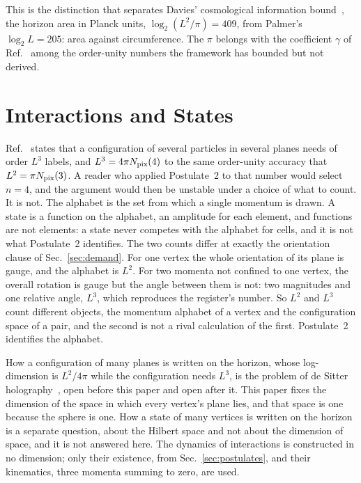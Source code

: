 \documentclass[aps,prd,twocolumn,superscriptaddress,nofootinbib]{revtex4-2}
\begin{document}
This is the distinction that separates Davies' cosmological information bound~\cite{davies2007}, the horizon area in Planck units, $\log_2(L^2/\pi) = 409$, from Palmer's $\log_2 L = 205$: area against circumference. The $\pi$ belongs with the coefficient $\gamma$ of Ref.~\cite{korytko2026} among the order-unity numbers the framework has bounded but not derived.

\section{Interactions and States}
\label{sec:states}

Ref.~\cite{korytko2026c} states that a configuration of several particles in several planes needs of order $L^3$ labels, and $L^3 = 4\pi N_{\rm pix}(4)$ to the same order-unity accuracy that $L^2 = \pi N_{\rm pix}(3)$. A reader who applied Postulate~2 to that number would select $n = 4$, and the argument would then be unstable under a choice of what to count. It is not. The alphabet is the set from which a single momentum is drawn. A state is a function on the alphabet, an amplitude for each element, and functions are not elements: a state never competes with the alphabet for cells, and it is not what Postulate~2 identifies. The two counts differ at exactly the orientation clause of Sec.~\ref{sec:demand}. For one vertex the whole orientation of its plane is gauge, and the alphabet is $L^2$. For two momenta not confined to one vertex, the overall rotation is gauge but the angle between them is not: two magnitudes and one relative angle, $L^3$, which reproduces the register's number. So $L^2$ and $L^3$ count different objects, the momentum alphabet of a vertex and the configuration space of a pair, and the second is not a rival calculation of the first. Postulate~2 identifies the alphabet.

How a configuration of many planes is written on the horizon, whose log-dimension is $L^2/4\pi$ while the configuration needs $L^3$, is the problem of de Sitter holography~\cite{bousso1999,banksfischler2001,parikh2003}, open before this paper and open after it. This paper fixes the dimension of the space in which every vertex's plane lies, and that space is one because the sphere is one. How a state of many vertices is written on the horizon is a separate question, about the Hilbert space and not about the dimension of space, and it is not answered here. The dynamics of interactions is constructed in no dimension; only their existence, from Sec.~\ref{sec:postulates}, and their kinematics, three momenta summing to zero, are used.
\end{document}
